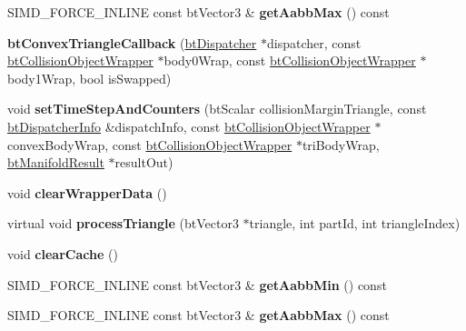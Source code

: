 \begin{DoxyCompactItemize}
\mbox{\label{classbtConvexTriangleCallback_a08c68e722c6503a2c1e9447516603231}} 
S\+I\+M\+D\+\_\+\+F\+O\+R\+C\+E\+\_\+\+I\+N\+L\+I\+NE const bt\+Vector3 \& {\bfseries get\+Aabb\+Max} () const
\item 
\mbox{\label{classbtConvexTriangleCallback_a6f4ecb0523e0400fa311a166ef44d615}} 
{\bfseries bt\+Convex\+Triangle\+Callback} (\hyperlink{classbtDispatcher}{bt\+Dispatcher} $\ast$dispatcher, const \hyperlink{structbtCollisionObjectWrapper}{bt\+Collision\+Object\+Wrapper} $\ast$body0\+Wrap, const \hyperlink{structbtCollisionObjectWrapper}{bt\+Collision\+Object\+Wrapper} $\ast$body1\+Wrap, bool is\+Swapped)
\item 
\mbox{\label{classbtConvexTriangleCallback_aa1deb837a2ff8a42f7f26f49194879ae}} 
void {\bfseries set\+Time\+Step\+And\+Counters} (bt\+Scalar collision\+Margin\+Triangle, const \hyperlink{structbtDispatcherInfo}{bt\+Dispatcher\+Info} \&dispatch\+Info, const \hyperlink{structbtCollisionObjectWrapper}{bt\+Collision\+Object\+Wrapper} $\ast$convex\+Body\+Wrap, const \hyperlink{structbtCollisionObjectWrapper}{bt\+Collision\+Object\+Wrapper} $\ast$tri\+Body\+Wrap, \hyperlink{classbtManifoldResult}{bt\+Manifold\+Result} $\ast$result\+Out)
\item 
\mbox{\label{classbtConvexTriangleCallback_ae89fd9d19380ccb4c9d76607027345dd}} 
void {\bfseries clear\+Wrapper\+Data} ()
\item 
\mbox{\label{classbtConvexTriangleCallback_aa48237b32669b0ff9b71f77b4d597aaa}} 
virtual void {\bfseries process\+Triangle} (bt\+Vector3 $\ast$triangle, int part\+Id, int triangle\+Index)
\item 
\mbox{\label{classbtConvexTriangleCallback_a881f3c19fa5af5a2bc2aa298c7b18d25}} 
void {\bfseries clear\+Cache} ()
\item 
\mbox{\label{classbtConvexTriangleCallback_a22e53c06500c04617b3a7b452f4af853}} 
S\+I\+M\+D\+\_\+\+F\+O\+R\+C\+E\+\_\+\+I\+N\+L\+I\+NE const bt\+Vector3 \& {\bfseries get\+Aabb\+Min} () const
\item 
\mbox{\label{classbtConvexTriangleCallback_a08c68e722c6503a2c1e9447516603231}} 
S\+I\+M\+D\+\_\+\+F\+O\+R\+C\+E\+\_\+\+I\+N\+L\+I\+NE const bt\+Vector3 \& {\bfseries get\+Aabb\+Max} () const
\end{DoxyCompactItemize}
